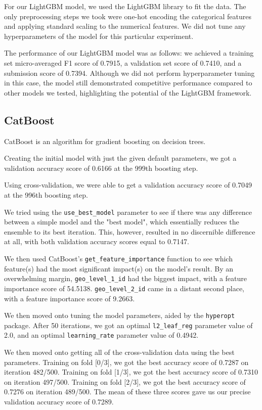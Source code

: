\documentclass{article}
\begin{document}
For our LightGBM model, we used the LightGBM library to fit the data.
The only preprocessing steps we took were one-hot encoding the categorical features and applying standard scaling to the numerical features.
We did not tune any hyperparameters of the model for this particular experiment.

The performance of our LightGBM model was as follows: we achieved a training set micro-averaged F1 score of 0.7915, a validation set score of 0.7410, and a submission score of 0.7394.
Although we did not perform hyperparameter tuning in this case, the model still demonstrated competitive performance compared to other models we tested, highlighting the potential of the LightGBM framework.

\subsection{CatBoost}
CatBoost is an algorithm for gradient boosting on decision trees.

Creating the initial model with just the given default parameters, we got a validation accuracy score of 0.6166 at the 999th boosting step.

Using cross-validation, we were able to get a validation accuracy score of 0.7049 at the 996th boosting step.

We tried using the \texttt{use\_best\_model} parameter to see if there was any difference between a simple model and the "best model", which essentially reduces the ensemble to its best iteration.
This, however, resulted in no discernible difference at all, with both validation accuracy scores equal to 0.7147.

We then used CatBoost's \texttt{get\_feature\_importance} function to see which feature(s) had the most significant impact(s) on the model's result.
By an overwhelming margin, \texttt{geo\_level\_1\_id} had the biggest impact, with a feature importance score of 54.5138.
\texttt{geo\_level\_2\_id} came in a distant second place, with a feature importance score of 9.2663.

We then moved onto tuning the model parameters, aided by the \texttt{hyperopt} package.
After 50 iterations, we got an optimal \texttt{l2\_leaf\_reg} parameter value of 2.0, and an optimal \texttt{learning\_rate} parameter value of 0.4942.

We then moved onto getting all of the cross-validation data using the best parameters.
Training on fold [0/3], we got the best accuracy score of 0.7287 on iteration 482/500.
Training on fold [1/3], we got the best accuracy score of 0.7310 on iteration 497/500.
Training on fold [2/3], we got the best accuracy score of 0.7276 on iteration 489/500.
The mean of these three scores gave us our precise validation accuracy score of 0.7289.
\end{document}

